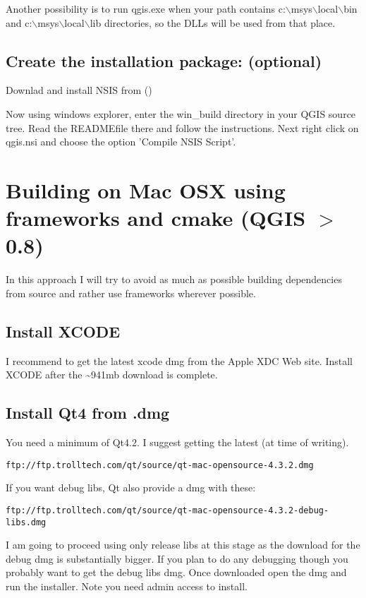 Another possibility is to run qgis.exe when your path contains
c:$\backslash$msys$\backslash$local$\backslash$bin and c:$\backslash$msys$\backslash$local$\backslash$lib directories, so the DLLs will be
used from that place.

\subsection{Create the installation package: (optional)}
Downlad and install NSIS from ()

Now using windows explorer, enter the win\_build directory in your QGIS source
tree. Read the READMEfile there and follow the instructions. Next right click
on qgis.nsi and choose the option 'Compile NSIS Script'. 


\section{Building on Mac OSX using frameworks and cmake (QGIS $>$ 0.8)}
In this approach I will try to avoid as much as possible building dependencies
from source and rather use frameworks wherever possible.

\subsection{Install XCODE}
I recommend to get the latest xcode dmg from the Apple XDC Web site. Install
XCODE after the \~{}941mb download is complete.

\subsection{Install Qt4 from .dmg}
You need a minimum of Qt4.2. I suggest getting the latest (at time of writing).

\begin{verbatim}
ftp://ftp.trolltech.com/qt/source/qt-mac-opensource-4.3.2.dmg
\end{verbatim}

If you want debug libs, Qt also provide a dmg with these:

\begin{verbatim}
ftp://ftp.trolltech.com/qt/source/qt-mac-opensource-4.3.2-debug-libs.dmg
\end{verbatim}

I am going to proceed using only release libs at this stage as the download for
the debug dmg is substantially bigger. If you plan to do any debugging though
you probably want to get the debug libs dmg. Once downloaded open the dmg and
run the installer. Note you need admin access to install.

